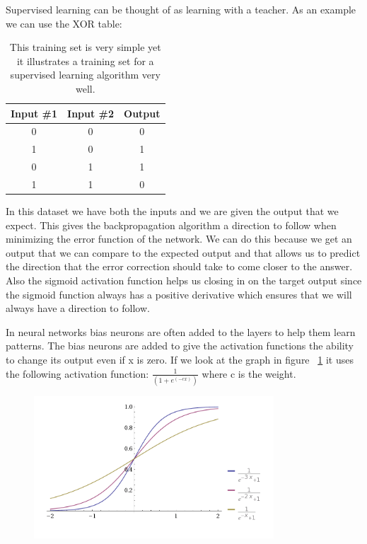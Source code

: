 Supervised learning can be thought of as learning with a teacher. As an example we can use the XOR table:

\begin{table}[h!]
\centering  %
\begin{tabular}{c c c} %
Input \#1 & Input \#2 & Output \\ [0.5ex] %
\hline                  %
0 & 0 & 0  \\ %
1 & 0 & 1  \\
0 & 1 & 1  \\
1 & 1 & 0 \\ [1ex] %
\hline %
\end{tabular}
\caption{This training set is very simple yet it illustrates a training set for a supervised learning algorithm very well.} %
\label{table:nonlin} %
\end{table}

In this dataset we have both the inputs and we are given the output that we expect. This gives the backpropagation algorithm a direction to follow when minimizing the error function of the network. We can do this because we get an output that we can compare to the expected output and that allows us to predict the direction that the error correction should take to come closer to the answer. Also the sigmoid activation function helps us closing in on the target output since the sigmoid function always has a positive derivative which ensures that we will always have a direction to follow\cite[p. 153]{rojas1996neural}.

In neural networks bias neurons are often added to the layers to help them learn patterns. The bias neurons are added to give the activation functions the ability to change its output even if x is zero. If we look at the graph in figure ~\ref{fig:activationFunctions} it uses the following activation function: \begin{math} \frac{1}{(1+e^{(-cx)})} \end{math} where c is the weight.

\begin{figure}[weight!]
\centering
\includegraphics[width=0.8\textwidth ,natwidth=410,natheight=237]{billeder/ActivationFunctions.png}
\caption{}
\label{fig:activationFunctions}
\end{figure}

